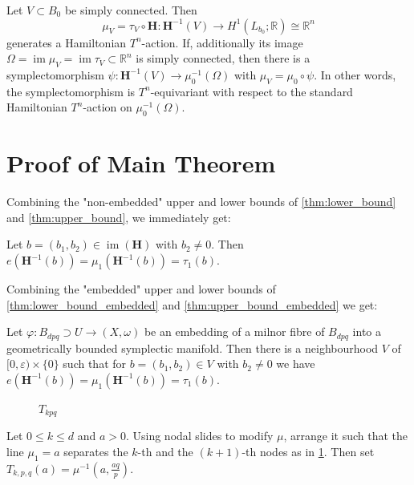 \documentclass[12pt,a4paper,draft]{scrartcl}
\DeclareMathOperator{\im}{im}
\begin{document}
\begin{proposition}
    \label{thm:flux_moment_map}
    Let $V \subset B_0$ be simply connected. Then 
    \[
        \mu_V = τ_V \circ \mathbf{H} \colon \mathbf{H}^{-1}(V) \rightarrow H^1(L_{b_0};\mathbb{R}) \cong \mathbb{R}^n
    \]
    generates a Hamiltonian $T^n$-action. If, additionally its image $\Omega = \im \mu_V = \im τ_V \subset \mathbb{R}^n$ is simply connected, then there is a symplectomorphism $\psi \colon \mathbf{H}^{-1}(V) \rightarrow \mu_0^{-1}(\Omega)$ with $\mu_V = \mu_0 \circ \psi$. In other words, the symplectomorphism is $T^n$-equivariant with respect to the standard Hamiltonian $T^n$-action on $\mu_0^{-1}(\Omega)$.
\end{proposition}

\section{Proof of Main Theorem}

Combining the "non-embedded" upper and lower bounds of \cref{thm:lower_bound} and \cref{thm:upper_bound}, we immediately get:

\begin{theorem}
  \label{thm:displacement_energy}
  Let $b=(b_1,b_2) ∈ \im(\symbf{H})$ with $b_2 ≠ 0$. Then $e(\symbf{H}^{-1}(b)) = μ_1(\symbf{H}^{-1}(b)) = τ_1(b)$.
\end{theorem}

Combining the "embedded" upper and lower bounds of \cref{thm:lower_bound_embedded} and \cref{thm:upper_bound_embedded} we get:

\begin{theorem}
  \label{thm:displacement_energy_embedded}
  Let $φ \colon B_{dpq} ⊃ U → (X,ω)$ be an embedding of a milnor fibre of $B_{dpq}$ into a geometrically bounded symplectic manifold. Then there is a neighbourhood $V$ of $[0,ε) × \{0\}$ such that for $b = (b_1,b_2) ∈ V$ with $b_2 ≠ 0$ we have $e(\symbf{H}^{-1}(b)) = μ_1(\symbf{H}^{-1}(b)) = τ_1(b)$.
\end{theorem}

\begin{figure}
  \centering
  \caption{$T_{kpq}$}
  \label{fig:tkpq_def}
\end{figure}

\begin{definition}
  Let $0 ≤ k ≤ d$ and $a>0$.
  Using nodal slides to modify $μ$, arrange it such that the line $μ_1 = a$ separates the $k$-th and the $(k+1)$-th nodes as in \cref{fig:tkpq_def}.
  Then set $T_{k,p,q}(a) = μ^{-1}(a,\frac{aq}{p})$.
\end{definition}
\end{document}
